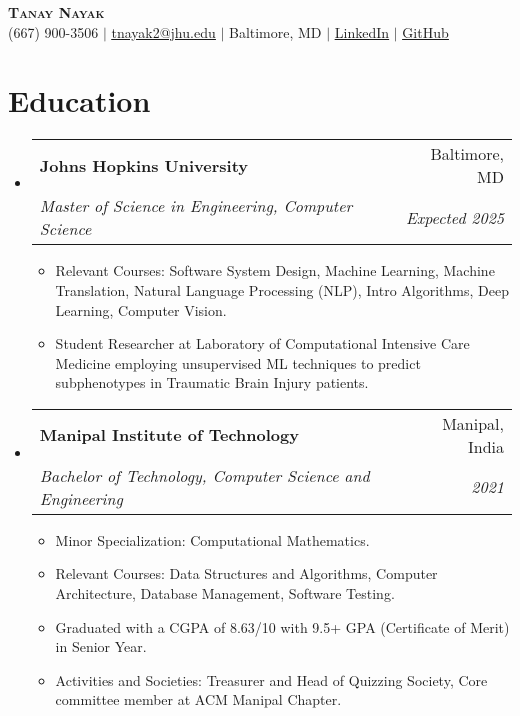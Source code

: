 \documentclass[letterpaper,10pt]{article} %
\makeatletter
\newcommand{\resumeSubheading}[4]{
  \vspace{-2pt}\item
    \begin{tabular*}{0.97\textwidth}[t]{l@{\extracolsep{\fill}}r}
      \textbf{#1} & #2 \\
      \textit{\small#3} & \textit{\small #4} \\
    \end{tabular*}\vspace{-7pt}
}
\newcommand{\resumeSubHeadingListStart}{\begin{itemize}[leftmargin=0.15in, label={}]}
\newcommand{\resumeSubHeadingListEnd}{\end{itemize}}
\makeatother
\begin{document}
\begin{center}
    \textbf{\Huge \scshape Tanay Nayak} \\ \vspace{1pt}
    \small (667) 900-3506 $|$ \href{mailto:tnayak2@jhu.edu}{\underline{tnayak2@jhu.edu}} $|$ 
    Baltimore, MD $|$
    \href{https://www.linkedin.com/in/tanay-nayak/}{\underline{LinkedIn}} $|$
    \href{https://github.com/tanaynayak}{\underline{GitHub}}
\end{center}

\section{Education}
  \resumeSubHeadingListStart
    \resumeSubheading
      {Johns Hopkins University}{Baltimore, MD}
      {Master of Science in Engineering, Computer Science}{Expected 2025}
    \begin{itemize}
        \item Relevant Courses: Software System Design, Machine Learning, Machine Translation, Natural Language Processing (NLP), Intro Algorithms, Deep Learning, Computer Vision.
        \item Student Researcher at Laboratory of Computational Intensive Care Medicine employing unsupervised ML techniques to predict subphenotypes in Traumatic Brain Injury patients.
    \end{itemize}
    
    \resumeSubheading
      {Manipal Institute of Technology}{Manipal, India}
      {Bachelor of Technology, Computer Science and Engineering}{2021}
    \begin{itemize}
        \item Minor Specialization: Computational Mathematics.
        \item Relevant Courses: Data Structures and Algorithms, Computer Architecture, Database Management, Software Testing.
        \item Graduated with a CGPA of 8.63/10 with 9.5+ GPA (Certificate of Merit) in Senior Year.
        \item Activities and Societies: Treasurer and Head of Quizzing Society, Core committee member at ACM Manipal Chapter.
    \end{itemize}
  \resumeSubHeadingListEnd

\end{document}
